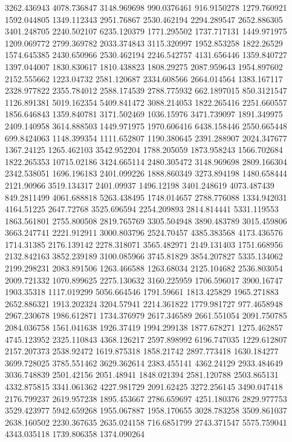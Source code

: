 3262.436943
4078.736847
3148.969698
990.0376461
916.9150278
1279.760921
1592.044805
1349.112343
2951.76867
2530.462194
2294.289547
2652.886305
3401.248705
2240.502107
6235.120379
1771.295502
1737.717131
1449.971975
1209.069772
2799.369782
2033.374843
3115.320997
1952.853258
1822.26529
1574.645385
2430.650966
2530.462194
2246.542757
4131.656446
1359.840727
1397.044007
1830.830617
1810.438823
1808.29275
2087.959643
1954.897602
2152.555662
1223.04732
2581.120687
2334.608566
2664.014564
1383.167117
2328.977822
2355.784012
2588.174539
2788.775932
662.1897015
850.3121547
1126.891381
5019.162354
5409.841472
3088.214053
1822.265416
2251.660557
1856.646843
1359.840781
3171.502469
1036.15976
3471.739097
1891.349975
2409.140958
3614.888503
1449.971975
1970.606416
6438.158446
2550.665448
699.8424063
1148.399354
1111.652807
1190.380645
2391.288907
2024.347677
1367.24125
1265.462103
3542.952204
1788.205059
1873.958243
1566.702684
1822.265353
10715.02186
3424.665114
2480.305472
3148.969698
2809.166304
2342.538051
1696.196183
2401.099226
1888.860349
3273.894198
1480.658444
2121.90966
3519.134317
2401.09937
1496.12198
3401.248619
4073.487439
849.2811499
4061.688818
5263.438495
1748.014657
2788.776088
1334.942031
4164.51225
2647.72768
3525.696594
2254.209893
2814.814441
5331.119553
1863.561801
2755.800508
2819.765769
3305.504948
3890.483789
3015.459806
3663.247741
2221.912911
3000.803796
2524.70457
4385.383568
4173.436576
1714.31385
2176.139142
2278.318071
3565.482971
2149.131403
1751.668956
2132.842163
3852.239189
3100.085966
3745.81829
3854.207827
5335.134062
2199.298231
2083.891506
1263.466588
1263.68034
2125.104682
2536.803054
2009.721332
1070.899625
2275.130632
3160.225959
1706.596017
3900.16747
1903.35318
1117.019299
5056.664546
1791.59661
1813.425829
1965.271883
2652.886321
1913.202324
3204.57941
2214.361822
1779.981727
977.4658948
2967.230678
1986.612871
1734.376979
2617.346589
2661.551054
2091.750785
2084.036758
1561.041638
1926.37419
1994.299138
1877.678271
1275.462857
4745.123952
2325.110843
4368.126217
2597.898992
6196.747035
1229.612807
2157.207373
2538.92472
1619.875318
1858.21742
2897.773418
1630.184277
3699.728025
3785.551462
3629.362614
2383.455141
4362.24129
2933.484649
3036.748839
2501.42156
2051.48941
1848.021394
2581.120788
2503.865131
4332.875815
3341.061362
4227.981729
2091.62425
3272.256145
3490.047418
2176.799237
2619.957238
1895.453667
2786.659697
4251.180376
2829.977753
3529.423977
5942.659268
1955.067887
1958.170655
3028.783258
3509.861037
2638.160502
2230.367635
2635.024158
716.6851799
2743.371547
5575.759041
4343.035118
1739.806358
1374.090264
